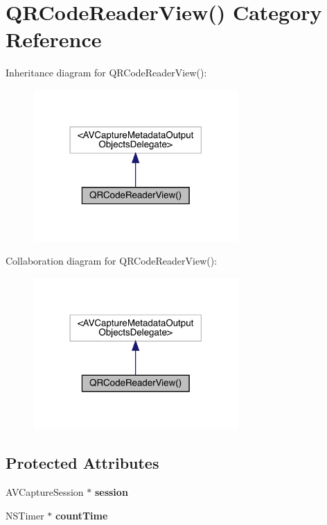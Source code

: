 \hypertarget{category_q_r_code_reader_view_07_08}{}\section{Q\+R\+Code\+Reader\+View() Category Reference}
\label{category_q_r_code_reader_view_07_08}


Inheritance diagram for Q\+R\+Code\+Reader\+View()\+:\nopagebreak
\begin{figure}[H]
\begin{center}
\leavevmode
\includegraphics[width=222pt]{category_q_r_code_reader_view_07_08__inherit__graph}
\end{center}
\end{figure}


Collaboration diagram for Q\+R\+Code\+Reader\+View()\+:\nopagebreak
\begin{figure}[H]
\begin{center}
\leavevmode
\includegraphics[width=222pt]{category_q_r_code_reader_view_07_08__coll__graph}
\end{center}
\end{figure}
\subsection*{Protected Attributes}
\begin{DoxyCompactItemize}
\item 
\mbox{\label{category_q_r_code_reader_view_07_08_ad8d0407095d4f082203209ea1ea028f4}} 
A\+V\+Capture\+Session $\ast$ {\bfseries session}
\item 
\mbox{\label{category_q_r_code_reader_view_07_08_ab96a0bc080547c9025351433cb76d45a}} 
N\+S\+Timer $\ast$ {\bfseries count\+Time}
\end{DoxyCompactItemize}
